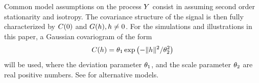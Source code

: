 Common model assumptions on the process $Y$ consist in assuming second order stationarity and isotropy. The covariance structure of the signal is then fully characterized by $C(0)$ and $G(h), h\neq 0$. 
For the simulations and illustrations in this paper, a Gaussian covariogram of the form
\begin{equation}\label{def:gaussiancovariogram}C(h)=\theta_1\exp\left(-\|h\|^2/\theta_2^2\right)\end{equation} will be used, where the deviation parameter $\theta_1$, and the scale parameter $\theta_2$ are real positive numbers. See \citet[p.~80]{chiles1999geostatistics} for alternative models.





